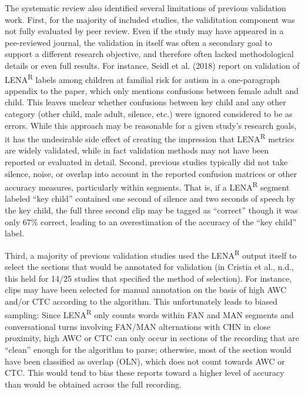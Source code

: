 \documentclass[english,table,man,floatsintext]{apa6}
\begin{document}
The systematic review also identified several limitations of previous validation work. First, for the majority of included studies, the validitation component was not fully evaluated by peer review. Even if the study may have appeared in a pee-reviewed journal, the validation in itself was often a secondary goal to support a different research objective, and therefore often lacked methodological details or even full results. For instance, Seidl et al. (2018) report on validation of LENA\textsuperscript{R} labels among children at familial risk for autism in a one-paragraph appendix to the paper, which only mentions confusions between female adult and child. This leaves unclear whether confusions between key child and any other category (other child, male adult, silence, etc.) were ignored considered to be as errors. While this approach may be reasonable for a given study's research goals, it has the undesirable side effect of creating the impression that LENA\textsuperscript{R} metrics are widely validated, while in fact validation methods may not have been reported or evaluated in detail.
Second, previous studies typically did not take silence, noise, or overlap into account in the reported confusion matrices or other accuracy measures, particularly within segments. That is, if a LENA\textsuperscript{R} segment labeled \enquote{key child} contained one second of silence and two seconds of speech by the key child, the full three second clip may be tagged as \enquote{correct} though it was only 67\% correct, leading to an overestimation of the accuracy of the \enquote{key child} label.

Third, a majority of previous validation studies used the LENA\textsuperscript{R} output itself to select the sections that would be annotated for validation (in Cristia et al., n.d., this held for 14/25 studies that specified the method of selection). For instance, clips may have been selected for manual annotation on the basis of high AWC and/or CTC according to the algorithm. This unfortunately leads to biased sampling: Since LENA\textsuperscript{R} only counts words within FAN and MAN segments and conversational turns involving FAN/MAN alternations with CHN in close proximity, high AWC or CTC can only occur in sections of the recording that are \enquote{clean} enough for the algorithm to parse; otherwise, most of the section would have been classified as overlap (OLN), which does not count towards AWC or CTC. This would tend to bias these reports toward a higher level of accuracy than would be obtained across the full recording.
\end{document}
